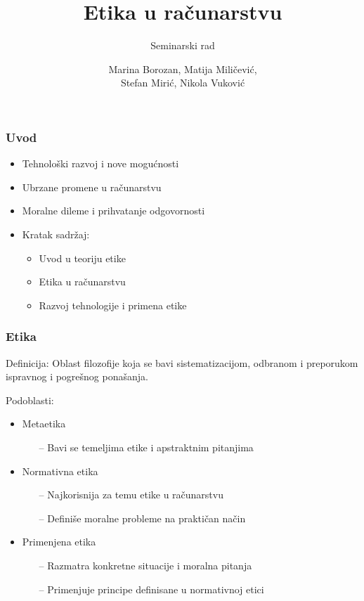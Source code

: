 \documentclass[pdf]{beamer}
\title{Etika u računarstvu}
\subtitle{Seminarski rad}%
\author[]{Marina Borozan, Matija Miličević,\\
	Stefan Mirić, Nikola Vuković}
\begin{document}
\begin{frame}
	\titlepage
	\end{frame}


\begin{frame}
\frametitle{Uvod}

\begin{itemize}
\item{Tehnološki razvoj i nove mogućnosti}
\item{Ubrzane promene u računarstvu}
\item{Moralne dileme i prihvatanje odgovornosti}
\item{Kratak sadržaj:}
	\begin{itemize}
	\item{Uvod u teoriju etike}
	\item{Etika u računarstvu}
	\item{Razvoj tehnologije i primena etike}
	\end{itemize}
\end{itemize}

\end{frame}
\begin{frame}
\frametitle{Etika}

Definicija: Oblast filozofije koja se bavi sistematizacijom, odbranom i preporukom ispravnog i pogrešnog ponašanja.

Podoblasti:
\begin{itemize}
\item{Metaetika}
	\begin{itemize}
	\item[--]{Bavi se temeljima etike i apstraktnim pitanjima}
	\end{itemize}
\item{Normativna etika}
	\begin{itemize}
	\item[--]{Najkorisnija za temu etike u računarstvu}
	\item[--]{Definiše moralne probleme na praktičan način}
	\end{itemize}
\item{Primenjena etika}
	\begin{itemize}
	\item[--]{Razmatra konkretne situacije i moralna pitanja}
	\item[--]{Primenjuje principe definisane u normativnoj etici}
	\end{itemize}
\end{itemize}

\end{frame}
\end{document}
